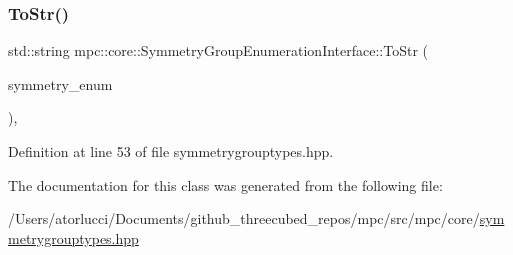 \subsubsection{\texorpdfstring{To\+Str()}{ToStr()}}
{\footnotesize\ttfamily std\+::string mpc\+::core\+::\+Symmetry\+Group\+Enumeration\+Interface\+::\+To\+Str (\begin{DoxyParamCaption}\item[{\mbox{\hyperlink{namespacempc_1_1core_a9d979684062547055a0ef5c13077bad8}{Symmetry\+Group\+Enumeration}}}]{symmetry\+\_\+enum }\end{DoxyParamCaption})\hspace{0.3cm}{\ttfamily [inline]}, {\ttfamily [static]}}



Definition at line 53 of file symmetrygrouptypes.\+hpp.



The documentation for this class was generated from the following file\+:\begin{DoxyCompactItemize}
\item 
/\+Users/atorlucci/\+Documents/github\+\_\+threecubed\+\_\+repos/mpc/src/mpc/core/\mbox{\hyperlink{symmetrygrouptypes_8hpp}{symmetrygrouptypes.\+hpp}}\end{DoxyCompactItemize}
